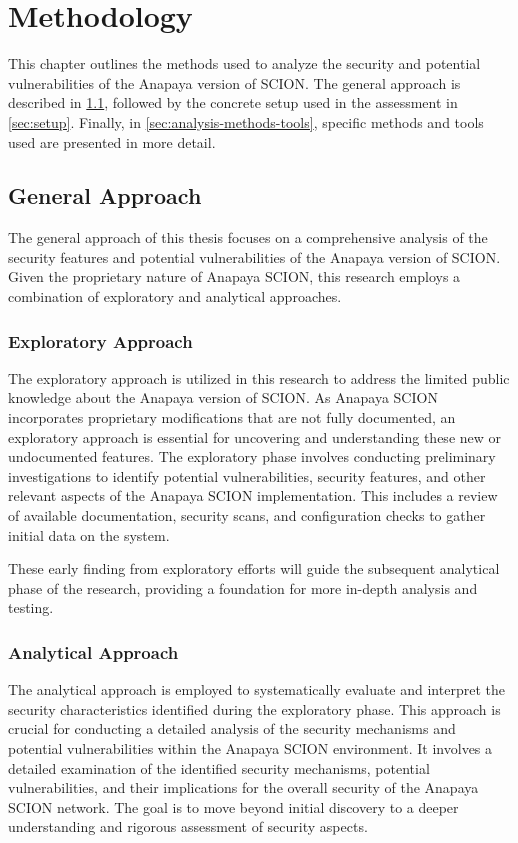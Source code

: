 \chapter{Methodology}
\label{ch:methodology}

This chapter outlines the methods used to analyze the security and potential vulnerabilities of the Anapaya version of SCION.
The general approach is described in \cref{sec:general-approach}, followed by the concrete setup used in the assessment in \cref{sec:setup}.
Finally, in \cref{sec:analysis-methods-tools}, specific methods and tools used are presented in more detail.


\section{General Approach}
\label{sec:general-approach}
The general approach of this thesis focuses on a comprehensive analysis of the security features and potential vulnerabilities of the Anapaya version of SCION.
Given the proprietary nature of Anapaya SCION, this research employs a combination of exploratory and analytical approaches.

\subsection{Exploratory Approach}
The exploratory approach is utilized in this research to address the limited public knowledge about the Anapaya version of SCION.
As Anapaya SCION incorporates proprietary modifications that are not fully documented, an exploratory approach is essential for uncovering and understanding these new or undocumented features.
The exploratory phase involves conducting preliminary investigations to identify potential vulnerabilities, security features, and other relevant aspects of the Anapaya SCION implementation.
This includes a review of available documentation, security scans, and configuration checks to gather initial data on the system.

These early finding from exploratory efforts will guide the subsequent analytical phase of the research, providing a foundation for more in-depth analysis and testing.

\subsection{Analytical Approach}
The analytical approach is employed to systematically evaluate and interpret the security characteristics identified during the exploratory phase.
This approach is crucial for conducting a detailed analysis of the security mechanisms and potential vulnerabilities within the Anapaya SCION environment.
It involves a detailed examination of the identified security mechanisms, potential vulnerabilities, and their implications for the overall security of the Anapaya SCION network.
The goal is to move beyond initial discovery to a deeper understanding and rigorous assessment of security aspects.


